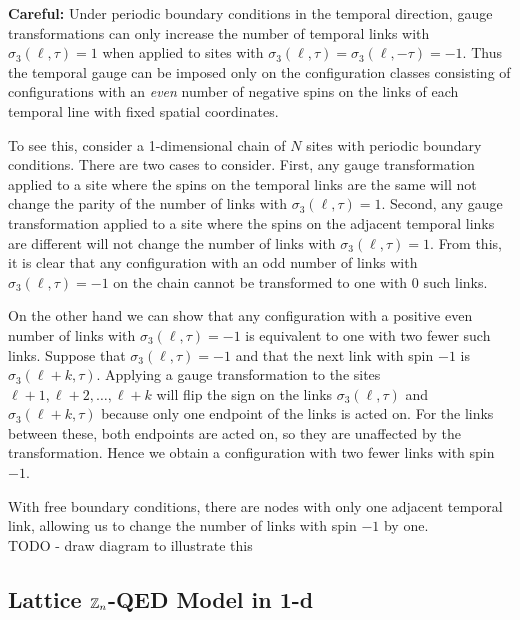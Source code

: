 \documentclass[11pt,reqno]{amsart}
\numberwithin{equation}{section}
\begin{document}
	
	\textbf{Careful:} Under periodic boundary conditions in the temporal direction, gauge transformations can only increase the number of temporal links with $\sigma_3(\ell,\tau)=1$ when applied to sites with $\sigma_3(\ell,\tau)=\sigma_3(\ell,-\tau)=-1$.
	Thus the temporal gauge can be imposed only on the configuration classes consisting of configurations with an \emph{even} number of negative spins on the links of each temporal line with fixed spatial coordinates.
	
	To see this, consider a 1-dimensional chain of $N$ sites with periodic boundary conditions. 
	There are two cases to consider.
	First, any gauge transformation applied to a site where the spins on the temporal links are the same will not change the parity of the number of links with $\sigma_3(\ell,\tau)=1$.
	Second, any gauge transformation applied to a site where the spins on the adjacent temporal links are different will not change the number of links with $\sigma_3(\ell,\tau)=1$.
	From this, it is clear that any configuration with an odd number of links with $\sigma_3(\ell,\tau)=-1$ on the chain cannot be transformed to one with 0 such links.
	
	On the other hand we can show that any configuration with a positive even number of links with $\sigma_3(\ell,\tau)=-1$ is equivalent to one with two fewer such links.
	Suppose that $\sigma_3(\ell,\tau)=-1$ and that the next link with spin $-1$ is $\sigma_3(\ell+k,\tau)$.
	Applying a gauge transformation to the sites $\ell+1,\ell+2,\ldots, \ell+k$ will flip the sign on the links $\sigma_3(\ell,\tau)$ and $\sigma_3(\ell+k,\tau)$ because only one endpoint of the links is acted on.
	For the links between these, both endpoints are acted on, so they are unaffected by the transformation.
	Hence we obtain a configuration with two fewer links with spin $-1$.
	
	With free boundary conditions, there are nodes with only one adjacent temporal link, allowing us to change the number of links with spin $-1$ by one. \\
	
	TODO - draw diagram to illustrate this
	
	\subsection{Lattice $\mathbb{Z}_n$-QED Model in 1-d}
	
\end{document}
